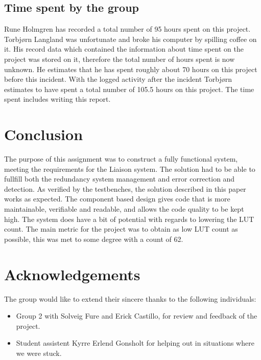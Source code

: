 \documentclass[a4paper]{IEEEtran}
\begin{document}
\subsection{Time spent by the group}
Rune Holmgren has recorded a total number of 95 hours spent on this project.
\break
Torbjørn Langland was unfortunate and broke his computer by spilling coffee on it.
His record data which contained the information about time spent on the project was stored on it, therefore the total number of hours spent is now unknown.
He estimates that he has spent roughly about 70 hours on this project before this incident.
With the logged activity after the incident Torbjørn estimates to have spent a total number of 105.5 hours on this project.
The time spent includes writing this report.

\section{Conclusion}
The purpose of this assignment was to construct a fully functional system, meeting the requirements for the Liaison system.
The solution had to be able to fullfill both the redundancy system management and error correction and detection.
As verified by the testbenches, the solution described in this paper works as expected.
The component based design gives code that is more maintainable, verifiable and readable, and allows the code quality to be kept high.
The system does have a bit of potential with regards to lowering the LUT count.
The main metric for the project was to obtain as low LUT count as possible, this was met to some degree with a count of 62.

\section{Acknowledgements}
The group would like to extend their sincere thanks to the following individuals:
\begin{itemize}
    \item Group 2 with Solveig Fure and Erick Castillo, for review and feedback of the project.
    \item Student assistent Kyrre Erlend Gonsholt for helping out in situations where we were stuck.
\end{itemize}

\clearpage
\begin{titlepage}


\nocite{*}
\end{titlepage}
\end{document}
